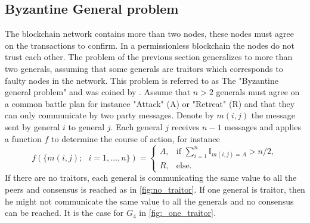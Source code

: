 \subsection{Byzantine General problem}
The blockchain network contains more than two nodes, these nodes must agree on the transactions to confirm. In a permissionless blockchain the nodes do not trust each other. The problem of the previous section generalizes to more than two generals, assuming that some generals are traitors which corresponds to faulty nodes in the network. This problem is referred to as The "Byzantine general problem" and was coined by \citet{lamport1982the}. Assume that $n>2$ generals must agree on a common battle plan for instance "Attack" (A) or "Retreat" (R) and that they can only communicate by two party messages. Denote by $m(i,j)$ the message sent by general $i$ to general $j$. Each general $j$ receives $n-1$ messages and applies a function $f$ to determine the course of action, for instance
$$
f(\{m(i,j);\text{ }i = 1,\ldots,n\}) = \begin{cases}
A,& \text{if }\sum_{i = 1}^n\mathbb{I}_{m(i,j) =A} >n/2,\\
R, &\text{else}.
\end{cases}
$$
If there are no traitors, each general is communicating the same value to all the peers and consensus is reached as in \cref{fig:no_traitor}. If one general is traitor, then he might not communicate the same value to all the generals and no consensus can be reached. It is the case for $G_4$ in \cref{fig:_one_traitor}.
